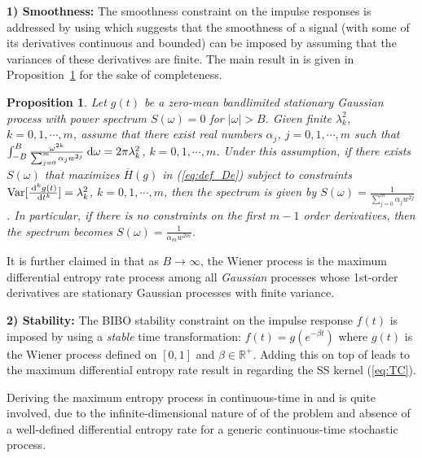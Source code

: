 \documentclass{article}
\DeclareMathOperator*{\var}{Var}
\newtheorem{prop}{Proposition}
\renewcommand{\d}{\:{\rm{d}}}
\begin{document}
\vspace{0.2cm}
\noindent\textbf{1) Smoothness:} The smoothness constraint on the impulse responses
is addressed by using \cite[Theorem 1]{DeTL98} which suggests that the
smoothness of a signal (with some of its derivatives continuous and
bounded) can be imposed by assuming that the variances of these
derivatives are finite.
The main result in \cite[Theorem 1]{DeTL98} is given in Proposition~\ref{prop:DeNicalao} for the sake of completeness.

\begin{prop}
\label{prop:DeNicalao}\cite[Theroem 1]{DeTL98}  Let $g(t)$ be a
zero-mean bandlimited stationary Gaussian process with power
spectrum $S(\omega)=0$  for $|\omega|> B$. Given finite
$\lambda_k^2$, $k=0,1,\cdots,m$, assume that there exist real
numbers $\alpha_j$, $j=0,1,\cdots,m$ such that
$\int_{-B}^{B}\frac{\omega^{2k}}{\sum_{j=0}^m \alpha_jw^{2j}}\d\omega
= 2\pi\lambda_k^2$, $k=0,1,\cdots,m$. Under this assumption, if
there exists $S(\omega)$ that maximizes $\overline{H}(g)$ in (\ref{eq:def_De})
subject to constraints $\var[\frac{\d^k
g(t)}{\d t^k}]=\lambda_k^2$, $k=0,1,\cdots,m$, then  the spectrum is
given by $S(\omega) = \frac{1}{\sum_{j=0}^m \alpha_jw^{2j}}$. In
particular, if there is no constraints on the first $m-1$ order
derivatives, then the spectrum becomes $S(\omega) =
\frac{1}{\alpha_mw^{2m}}$.
\end{prop}
It is further claimed in  \cite{pillonetto2011} that as $B\rightarrow\infty$, the Wiener
process is the maximum differential entropy rate process among all
\emph{Gaussian} processes whose 1st-order derivatives are stationary
Gaussian processes with finite variance.

\vspace{0.2cm}
\noindent
\textbf{2) Stability:} The BIBO stability constraint on the impulse
response $f(t)$ is imposed by using a \emph{stable} time
transformation: $f(t)=g(e^{-\beta t})$ where $g(t)$ is the Wiener
process defined on $[0,1]$ and $\beta\in\mathbb R^+$. Adding this
on top of \cite[Theorem 1]{DeTL98} leads to the maximum differential
entropy rate result in \cite[Proposition 2]{pillonetto2011}
regarding the SS kernel (\ref{eq:TC}).




Deriving the maximum entropy process in continuous-time in \cite{DeTL98} and \cite{pillonetto2011} is quite involved, due to the infinite-dimensional nature of of the problem and absence of a well-defined differential entropy rate for a generic continuous-time stochastic process.
\end{document}
